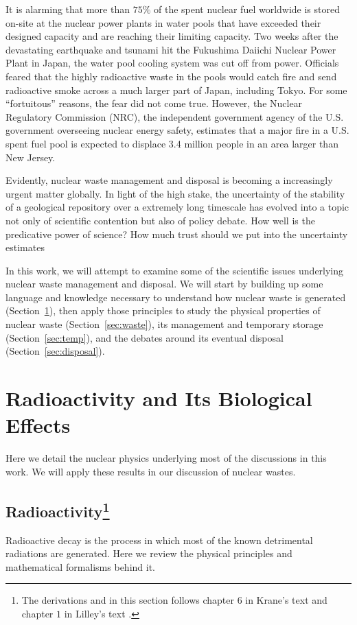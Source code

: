 \documentclass[nofootinbib,preprint,aps]{revtex4-1}
\begin{document}
It is alarming that more than $75\%$ of the spent nuclear fuel worldwide is stored on-site at the nuclear power plants
in water pools that have exceeded their designed capacity and are reaching their limiting capacity.\cite{aa12}
Two weeks after the devastating earthquake and tsunami hit the Fukushima Daiichi Nuclear Power Plant in Japan,
the water pool cooling system was cut off from power. Officials feared that
the highly radioactive waste in the pools would catch fire and send radioactive smoke
across a much larger part of Japan, including Tokyo.\cite{s16} For some ``fortuitous'' reasons, the fear did not come true.
However, the Nuclear Regulatory Commission (NRC), the independent government agency
of the U.S. government overseeing nuclear energy safety,
estimates that a major fire in a U.S. spent fuel pool is expected to
displace 3.4 million people in an area larger than New Jersey.\cite{s16}

Evidently, nuclear waste management and disposal is becoming a increasingly urgent matter globally.
In light of the high stake,
the uncertainty of the stability of a geological repository over a extremely long timescale has evolved into 
a topic not only of scientific contention but also of policy debate.
How well is the predicative power of science? How much trust should we put into the uncertainty estimates

In this work, we will attempt to examine some of the scientific issues underlying nuclear waste management
and disposal. We will start by building up some
language and knowledge necessary to understand how nuclear waste is generated (Section~\ref{sec:phys}),
then apply those principles to study
the physical properties of nuclear waste (Section~\ref{sec:waste}), its management and temporary storage
(Section~\ref{sec:temp}), and the debates around its eventual disposal (Section~\ref{sec:disposal}).

\section{Radioactivity and Its Biological Effects}
\label{sec:phys}
    Here we detail the nuclear physics underlying most of the discussions
    in this work. We will apply these results in our discussion of nuclear wastes.
    \subsection{Radioactivity\footnote{
    The derivations and in this section follows chapter $6$ in
    Krane's text \cite{k88} and chapter $1$ in Lilley's text \cite{l01}.
    }}
    Radioactive decay is the process in which most of the known detrimental radiations are generated.
    Here we review the physical principles and mathematical formalisms behind it.
\end{document}
